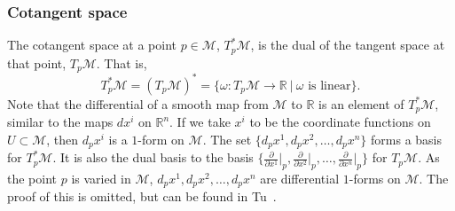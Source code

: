 \documentclass{article}
\theoremstyle{definition}
\theoremstyle{named}
\begin{document}
\subsubsection{Cotangent space}
The cotangent space at a point $p \in \mathcal{M}$, $T_p^*\mathcal{M}$, is the dual of the tangent space at that point, $T_p\mathcal{M}$. That is, 
$$T_p^*\mathcal{M} = (T_p\mathcal{M})^* = \{ \omega: T_p\mathcal{M} \to \mathbb{R} \ | \ \omega \text{ is linear} \}.$$
Note that the differential of a smooth map from $\mathcal{M}$ to $\mathbb{R}$ is an element of $T_p^*\mathcal{M}$, similar to the maps $dx^i$ on $\mathbb{R}^n$. If we take $x^i$ to be the coordinate functions on $U \subset \mathcal{M}$, then $d_px^i$  is a $1$-form on $\mathcal{M}$. The set $\{d_px^1, d_px^2, \ldots, d_px^n\}$ forms a basis for $T_p^*\mathcal{M}$. It is also the dual basis to the basis $\{\frac{\partial}{\partial x^1}\big|_p, \frac{\partial}{\partial x^2}\big|_p, \ldots, \frac{\partial}{\partial x^n}\big|_p\}$ for $T_p\mathcal{M}$. As the point $p$ is varied in $\mathcal{M}$, $d_px^1, d_px^2, \ldots, d_px^n$ are differential $1$-forms on $\mathcal{M}$. The proof of this is omitted, but can be found in Tu~\cite{tu2010introduction}.
\end{document}

